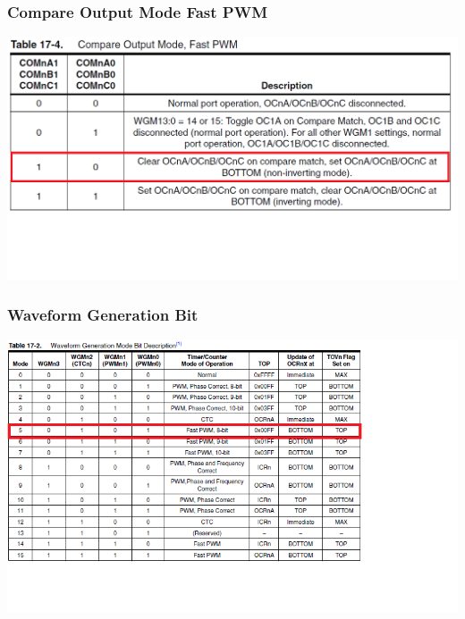 \documentclass[10pt,red]{beamer}
\begin{document}
\begin{frame}
		\frametitle{Compare Output Mode Fast PWM} \pause
			\includegraphics[width = \linewidth]{compare_output_mode_fastpwm}
\end{frame}

\begin{frame}[shrink=5]
		\frametitle{Waveform Generation Bit} \pause
			\includegraphics[width = \linewidth]{waveform_generation}
\end{frame}
\end{document}
